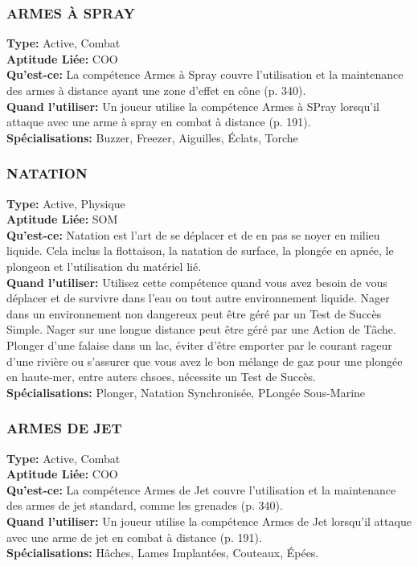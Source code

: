 \subsubsection{ARMES À SPRAY} \textbf{Type:} Active, Combat \\ \textbf{Aptitude Liée:} COO \\ \textbf{Qu'est-ce:} La compétence Armes à Spray couvre l'utilisation et la maintenance des armes à distance ayant une zone d'effet en cône (p. 340). \\ \textbf{Quand l'utiliser:} Un joueur utilise la compétence Armes à SPray lorsqu'il attaque avec une arme à spray en combat à distance (p. 191). \\ \textbf{Spécialisations:} Buzzer, Freezer, Aiguilles, Éclats, Torche 

\subsubsection{NATATION} \textbf{Type:} Active, Physique\\ \textbf{Aptitude Liée:} SOM \\ \textbf{Qu'est-ce:} Natation est l'art de se déplacer et de en pas se noyer en milieu liquide. Cela inclus la flottaison, la natation de surface, la plongée en apnée, le plongeon et l'utilisation du matériel lié. \\ \textbf{Quand l'utiliser:} Utilisez cette compétence quand vous avez besoin de vous déplacer et de survivre dans l'eau ou tout autre environnement liquide. Nager dans un environnement non dangereux peut être géré par un Test de Succès Simple. Nager sur une longue distance peut être géré par une Action de Tâche. Plonger d'une falaise dans un lac, éviter d'être emporter par le courant rageur d'une rivière ou s'assurer que vous avez le bon mélange de gaz pour une plongée en haute-mer, entre auters chsoes, nécessite un Test de Succès. \\ \textbf{Spécialisations:} Plonger, Natation Synchronisée, PLongée Sous-Marine 

\subsubsection{ARMES DE JET} \textbf{Type:} Active, Combat \\ \textbf{Aptitude Liée:} COO \\ \textbf{Qu'est-ce:} La compétence Armes de Jet couvre l'utilisation et la maintenance des armes de jet standard, comme les grenades (p. 340). \\ \textbf{Quand l'utiliser:} Un joueur utilise la compétence Armes de Jet lorsqu'il attaque avec une arme de jet en combat à distance (p. 191). \\ \textbf{Spécialisations:} Hâches, Lames Implantées, Couteaux, Épées. 







